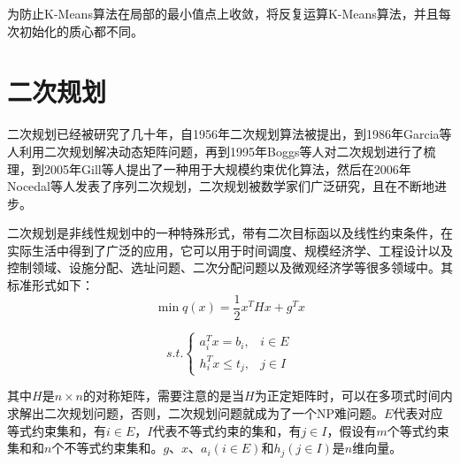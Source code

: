 
为防止K-Means算法在局部的最小值点上收敛，将反复运算K-Means算法，并且每次初始化的质心都不同。


\section{二次规划}
二次规划已经被研究了几十年，自1956年二次规划算法被提出，到1986年Garcia等人\cite{Garcia_1986}利用二次规划解决动态矩阵问题，再到1995年Boggs等人\cite{Boggs_1995}对二次规划进行了梳理，到2005年Gill等人\cite{Gill_2001}提出了一种用于大规模约束优化算法，然后在2006年Nocedal等人\cite{Nocedal_2006}发表了序列二次规划，二次规划被数学家们广泛研究，且在不断地进步。

二次规划是非线性规划中的一种特殊形式，带有二次目标函以及线性约束条件，在实际生活中得到了广泛的应用，它可以用于时间调度、规模经济学、工程设计以及控制领域、设施分配、选址问题、二次分配问题以及微观经济学等很多领域中。其标准形式如下：
\begin{equation}
	\label{qp:target_sample}
	\min q(x)=\frac{1}{2}x^THx+g^Tx
\end{equation}

\begin{equation}
	s.t.
	\begin{cases}
		a_i^Tx=b_i, & i \in E \\
		h_i^Tx \leq t_j, & j \in I
	\end{cases}
	\label{equation:jump}
\end{equation}


其中$H$是${n \times n}$的对称矩阵，需要注意的是当${H}$为正定矩阵时，可以在多项式时间内求解出二次规划问题，否则，二次规划问题就成为了一个NP难问题。${E}$代表对应等式约束集和，有${i \in E}$，${I}$代表不等式约束的集和，有${j \in I}$，假设有${m}$个等式约束集和和${n}$个不等式约束集和。${g}$、${x}$、${a_i(i \in E)}$和${h_j(j \in I)}$是${n}$维向量。

